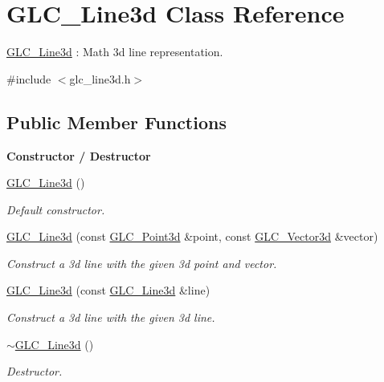 \hypertarget{class_g_l_c___line3d}{\section{G\-L\-C\-\_\-\-Line3d Class Reference}
\label{class_g_l_c___line3d}
}


\hyperlink{class_g_l_c___line3d}{G\-L\-C\-\_\-\-Line3d} \-: Math 3d line representation.  




{\ttfamily \#include $<$glc\-\_\-line3d.\-h$>$}

\subsection*{Public Member Functions}
\begin{Indent}{\bf Constructor / Destructor}\par
\begin{DoxyCompactItemize}
\item 
\hyperlink{class_g_l_c___line3d_a718b81eb882fe5acdcaaf4e7c652197f}{G\-L\-C\-\_\-\-Line3d} ()
\begin{DoxyCompactList}\small\item\em Default constructor. \end{DoxyCompactList}\item 
\hyperlink{class_g_l_c___line3d_afb5cf977ad6470b2fe4c1080cd9c5add}{G\-L\-C\-\_\-\-Line3d} (const \hyperlink{glc__vector3d_8h_a4e13a9bbc7ab3d34de7e98b41836772c}{G\-L\-C\-\_\-\-Point3d} \&point, const \hyperlink{class_g_l_c___vector3d}{G\-L\-C\-\_\-\-Vector3d} \&vector)
\begin{DoxyCompactList}\small\item\em Construct a 3d line with the given 3d point and vector. \end{DoxyCompactList}\item 
\hyperlink{class_g_l_c___line3d_aed646187b20a5d116d1561cbfeb776c5}{G\-L\-C\-\_\-\-Line3d} (const \hyperlink{class_g_l_c___line3d}{G\-L\-C\-\_\-\-Line3d} \&line)
\begin{DoxyCompactList}\small\item\em Construct a 3d line with the given 3d line. \end{DoxyCompactList}\item 
\hyperlink{class_g_l_c___line3d_a2f7e8040380e5ab019dab174c3eac916}{$\sim$\-G\-L\-C\-\_\-\-Line3d} ()
\begin{DoxyCompactList}\small\item\em Destructor. \end{DoxyCompactList}\end{DoxyCompactItemize}
\end{Indent}
